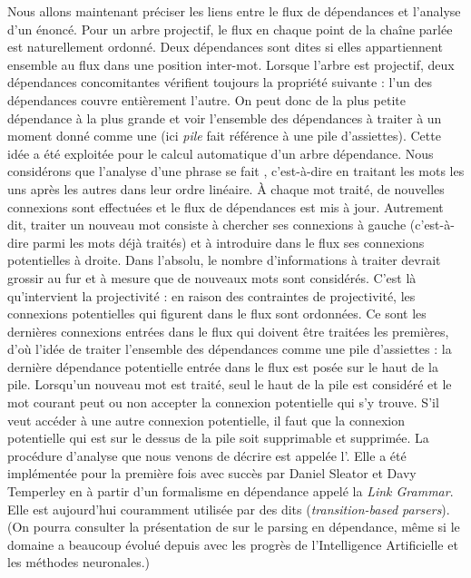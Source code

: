 {    Nous allons maintenant préciser les liens entre le flux de dépendances et l’analyse d’un énoncé. Pour un arbre projectif, le flux en chaque point de la chaîne parlée est naturellement ordonné. Deux dépendances sont dites  si elles appartiennent ensemble au flux dans une position inter-mot. Lorsque l’arbre est projectif, deux dépendances concomitantes vérifient toujours la propriété suivante : l’un des dépendances couvre entièrement l’autre. On peut donc  de la plus petite dépendance à la plus grande et voir l’ensemble des dépendances à traiter à un moment donné comme une  (ici \textit{pile} fait référence à une pile d’assiettes). Cette idée a été exploitée pour le calcul automatique d’un arbre dépendance. Nous considérons que l’analyse d’une phrase se fait , c’est-à-dire en traitant les mots les uns après les autres dans leur ordre linéaire. À chaque mot traité, de nouvelles connexions sont effectuées et le flux de dépendances est mis à jour. Autrement dit, traiter un nouveau mot consiste à chercher ses connexions à gauche (c’est-à-dire parmi les mots déjà traités) et à introduire dans le flux ses connexions potentielles à droite. Dans l’absolu, le nombre d’informations à traiter devrait grossir au fur et à mesure que de nouveaux mots sont considérés. C’est là qu’intervient la projectivité : en raison des contraintes de projectivité, les connexions potentielles qui figurent dans le flux sont ordonnées. Ce sont les dernières connexions entrées dans le flux qui doivent être traitées les premières, d’où l’idée de traiter l’ensemble des dépendances comme une pile d’assiettes : la dernière dépendance potentielle entrée dans le flux est posée sur le haut de la pile. Lorsqu’un nouveau mot est traité, seul le haut de la pile est considéré et le mot courant peut ou non accepter la connexion potentielle qui s’y trouve. S’il veut accéder à une autre connexion potentielle, il faut que la connexion potentielle qui est sur le dessus de la pile soit supprimable et supprimée. La procédure d’analyse que nous venons de décrire est appelée l’. Elle a été implémentée pour la première fois avec succès par Daniel Sleator et Davy Temperley en \citeyear{sleator1993parsing} à partir d'un formalisme en dépendance appelé la \textit{Link Grammar}. Elle est aujourd'hui couramment utilisée par des  dits  (\textit{transition-based parsers}). (On pourra consulter la présentation de \citet{kubler2009dependency} sur le parsing en dépendance, même si le domaine a beaucoup évolué depuis avec les progrès de l'Intelligence Artificielle et les méthodes neuronales.)

}
